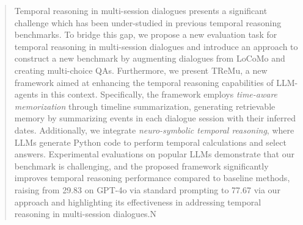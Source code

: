 \begin{abstract}
     Temporal reasoning in multi-session dialogues presents a significant challenge which has been under-studied in previous temporal reasoning benchmarks. To bridge this gap, we propose a new evaluation task for temporal reasoning in multi-session dialogues and introduce an approach to construct a new benchmark by augmenting dialogues from LoCoMo and creating multi-choice QAs. Furthermore, we present TReMu, a new framework aimed at enhancing the temporal reasoning capabilities of LLM-agents in this context. Specifically, the framework employs \textit{time-aware memorization} through timeline summarization, generating retrievable memory by summarizing events in each dialogue session with their inferred dates. Additionally, we integrate \textit{neuro-symbolic temporal reasoning}, where LLMs generate Python code to perform temporal calculations and select answers. 
    Experimental evaluations on popular LLMs demonstrate that our benchmark is challenging, and the proposed framework significantly improves temporal reasoning performance compared to baseline methods, raising from 29.83 on GPT-4o via standard prompting to 77.67 via our approach and highlighting its effectiveness in addressing temporal reasoning in multi-session dialogues.N
\end{abstract}